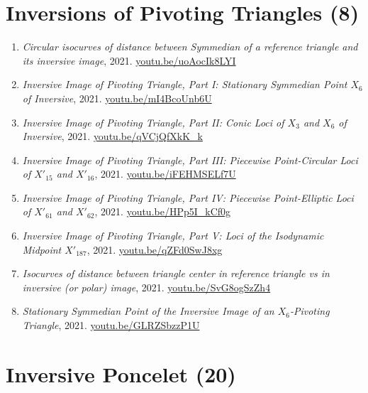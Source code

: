 \documentclass[12pt]{article}
\begin{document}
\section{Inversions of Pivoting Triangles (8)}

\begin{enumerate}[resume]
\item \textit{Circular isocurves of distance between Symmedian of a reference triangle and its inversive image}, 2021. \href{https://youtu.be/uoAocIk8LYI}{\url{youtu.be/uoAocIk8LYI}}
\item \textit{Inversive Image of Pivoting Triangle, Part I: Stationary Symmedian Point $X_{6}$ of Inversive}, 2021. \href{https://youtu.be/mI4BcoUnb6U}{\url{youtu.be/mI4BcoUnb6U}}
\item \textit{Inversive Image of Pivoting Triangle, Part II: Conic Loci of $X_{3}$ and $X_{6}$ of Inversive}, 2021. \href{https://youtu.be/qVCjQfXkK_k}{\url{youtu.be/qVCjQfXkK\_k}}
\item \textit{Inversive Image of Pivoting Triangle, Part III: Piecewise Point-Circular Loci of $X'_{15}$ and $X'_{16}$}, 2021. \href{https://youtu.be/iFEHMSELf7U}{\url{youtu.be/iFEHMSELf7U}}
\item \textit{Inversive Image of Pivoting Triangle, Part IV: Piecewise Point-Elliptic Loci of $X'_{61}$ and $X'_{62}$}, 2021. \href{https://youtu.be/HPp5I_kCf0g}{\url{youtu.be/HPp5I\_kCf0g}}
\item \textit{Inversive Image of Pivoting Triangle, Part V: Loci of the Isodynamic Midpoint $X'_{187}$}, 2021. \href{https://youtu.be/qZFd0SwJ8xg}{\url{youtu.be/qZFd0SwJ8xg}}
\item \textit{Isocurves of distance between triangle center in reference triangle vs in inversive (or polar) image}, 2021. \href{https://youtu.be/SvG8ogSzZh4}{\url{youtu.be/SvG8ogSzZh4}}
\item \textit{Stationary Symmedian Point of the Inversive Image of an $X_{6}$-Pivoting Triangle}, 2021. \href{https://youtu.be/GLRZSbzzP1U}{\url{youtu.be/GLRZSbzzP1U}}
\end{enumerate}

\section{Inversive Poncelet (20)}
\end{document}
